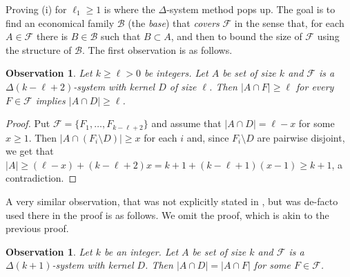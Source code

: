 \documentclass[graybox]{svmult}
\renewcommand{\ge}{\geqslant}
\newcommand{\ff}{\mathcal{F}}
\newcommand{\m}{\mathcal}
\newtheorem{obs}[thm]{Observation}
\begin{document}
Proving (i) for $\ell_1\ge 1$ is where the $\Delta$-system method pops up. The goal is to find an economical family $\mathcal B$ (the {\it base}) that {\em covers} $\mathcal F$ in the sense that, for each $A\in \ff$ there is $B\in \m B$ such that $B\subset A$, and then to bound the size of $\m F$ using the structure of $\m B$. The first observation is as follows.
\begin{obs}\label{obsdelta1} Let $k\ge \ell>0$ be integers. Let $A$ be set of size $k$ and $\m F$ is a $\Delta(k-\ell+2)$-system with kernel $D$ of size $\ell$. Then $|A\cap F|\ge \ell$ for every $F\in \m F$ implies $|A\cap D|\ge \ell$.
\end{obs}
\begin{proof}
  Put $\ff = \{F_1,\ldots, F_{k-\ell+2}\}$ and assume that $|A\cap D| = \ell-x$ for some $x\ge 1$. Then $|A\cap (F_i\setminus D)|\ge x$ for each $i$ and, since $F_i\setminus D$ are pairwise disjoint, we get that $|A|\ge (\ell-x)+(k-\ell+2)x =k+1+(k-\ell+1)(x-1)\ge k+1$, a contradiction.
\end{proof}
A very similar observation, that was not explicitly stated in \cite{DEF}, but was de-facto used there in the proof is as follows. We omit the proof, which is akin to the previous proof.
\begin{obs}\label{obsdelta2} Let $k$ be an integer. Let $A$ be set of size $k$ and $\m F$ is a $\Delta(k+1)$-system with kernel $D$. Then $|A\cap D| = |A\cap F|$ for some $F\in \m F$.
\end{obs}
\end{document}
